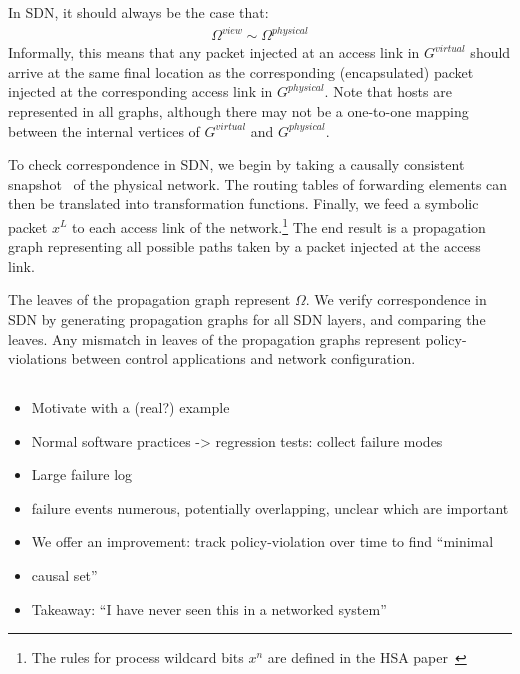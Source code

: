 In SDN, it should always be the case that:
\begin{align*}
\Omega^{view} \sim \Omega^{physical}
\end{align*}
Informally, this means that any packet injected at an access link in $G^{virtual}$ should arrive at
the same final location as the corresponding (encapsulated) packet injected at the
corresponding access link in $G^{physical}$. Note that hosts are represented
in all graphs, although there may not be a one-to-one mapping between the
internal vertices of $G^{virtual}$ and $G^{physical}$.

To check correspondence in SDN, we begin by taking a causally consistent
snapshot~\cite{Chandy:1985:DSD:214451.214456} of the physical network. The routing
tables of forwarding elements can then be translated into transformation functions.
Finally, we feed a symbolic packet $x^L$ to each access link of the
network.\footnote{The rules for process wildcard bits $x^n$ are defined in
the HSA paper~\cite{hsa}} The end result is a propagation graph representing all possible paths taken by a packet injected
at the access link.

The leaves of the propagation graph represent $\Omega$. We
verify correspondence in SDN by generating propagation graphs for all SDN layers,
and comparing the leaves. Any mismatch in leaves of the propagation graphs
represent policy-violations between control applications and network
configuration.

\subsection{\SIMULATOR{}}


\begin{itemize}
\item Motivate with a (real?) example
\item Normal software practices -> regression tests: collect failure modes
\item Large failure log
\item failure events numerous, potentially overlapping, unclear which are important
\item We offer an improvement: track policy-violation over time to find “minimal
\item causal set”
\item Takeaway: “I have never seen this in a networked system”
\end{itemize}


